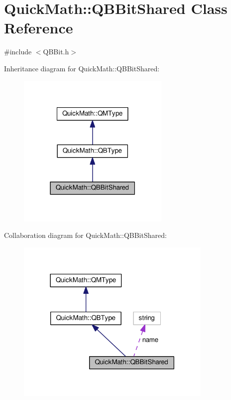 \hypertarget{classQuickMath_1_1QBBitShared}{}\section{Quick\+Math\+:\+:Q\+B\+Bit\+Shared Class Reference}
\label{classQuickMath_1_1QBBitShared}


{\ttfamily \#include $<$Q\+B\+Bit.\+h$>$}



Inheritance diagram for Quick\+Math\+:\+:Q\+B\+Bit\+Shared\+:
\nopagebreak
\begin{figure}[H]
\begin{center}
\leavevmode
\includegraphics[width=207pt]{classQuickMath_1_1QBBitShared__inherit__graph}
\end{center}
\end{figure}


Collaboration diagram for Quick\+Math\+:\+:Q\+B\+Bit\+Shared\+:
\nopagebreak
\begin{figure}[H]
\begin{center}
\leavevmode
\includegraphics[width=266pt]{classQuickMath_1_1QBBitShared__coll__graph}
\end{center}
\end{figure}
